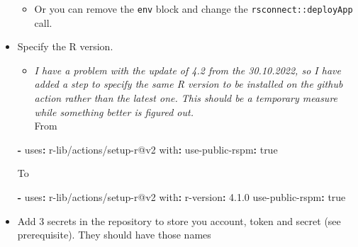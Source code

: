 \documentclass[
]{book}
\newenvironment{Shaded}{\begin{snugshade}}{\end{snugshade}}
\newcommand{\AttributeTok}[1]{\textcolor[rgb]{0.77,0.63,0.00}{#1}}
\newcommand{\CharTok}[1]{\textcolor[rgb]{0.31,0.60,0.02}{#1}}
\newcommand{\FunctionTok}[1]{\textcolor[rgb]{0.00,0.00,0.00}{#1}}
\newcommand{\KeywordTok}[1]{\textcolor[rgb]{0.13,0.29,0.53}{\textbf{#1}}}
\newcommand{\NormalTok}[1]{#1}
\newcommand{\StringTok}[1]{\textcolor[rgb]{0.31,0.60,0.02}{#1}}
\providecommand{\tightlist}{%
  \setlength{\itemsep}{0pt}\setlength{\parskip}{0pt}}
\begin{document}
\begin{itemize}
  \begin{itemize}
  \tightlist
  \item
    Or you can remove the \texttt{env} block and change the \texttt{rsconnect::deployApp} call.
  \end{itemize}

\begin{Shaded}
\end{Shaded}
\item
  Specify the R version.

  \begin{itemize}
  \tightlist
  \item
    \emph{I have a problem with the update of 4.2 from the 30.10.2022, so I have added a step to specify the same R version to be installed on the github action rather than the latest one. This should be a temporary measure while something better is figured out.}\\
    From
  \end{itemize}

\begin{Shaded}
\begin{Highlighting}[]
\AttributeTok{  }\KeywordTok{{-}}\AttributeTok{ }\FunctionTok{uses}\KeywordTok{:}\AttributeTok{ r{-}lib/actions/setup{-}r@v2}
\AttributeTok{    }\FunctionTok{with}\KeywordTok{:}
\AttributeTok{      }\FunctionTok{use{-}public{-}rspm}\KeywordTok{:}\AttributeTok{ }\CharTok{true}
\end{Highlighting}
\end{Shaded}

  To

\begin{Shaded}
\begin{Highlighting}[]
\AttributeTok{  }\KeywordTok{{-}}\AttributeTok{ }\FunctionTok{uses}\KeywordTok{:}\AttributeTok{ r{-}lib/actions/setup{-}r@v2}
\AttributeTok{    }\FunctionTok{with}\KeywordTok{:}
\AttributeTok{      }\FunctionTok{r{-}version}\KeywordTok{:}\AttributeTok{ }\StringTok{\textquotesingle{}4.1.0\textquotesingle{}}
\AttributeTok{      }\FunctionTok{use{-}public{-}rspm}\KeywordTok{:}\AttributeTok{ }\CharTok{true}
\end{Highlighting}
\end{Shaded}
\item
  Add 3 secrets in the repository to store you account, token and secret (see prerequisite). They should have those names


\end{itemize}
\end{document}
